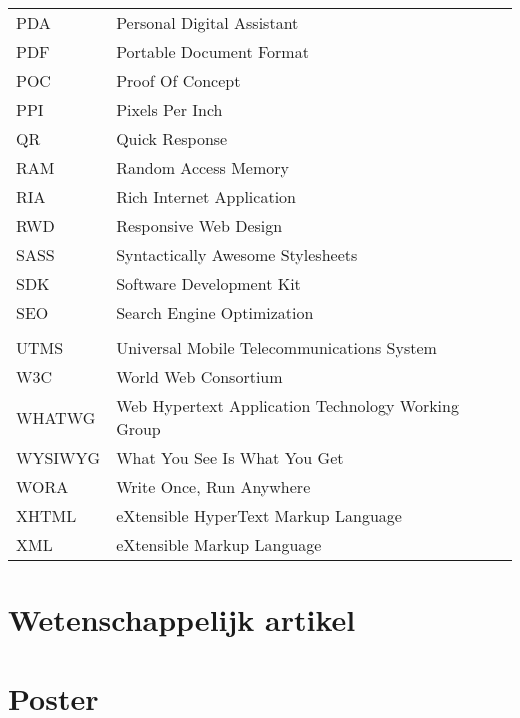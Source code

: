\documentclass[master=cws,dutch,masteroption={vs,gs},inputenc=utf8]{kulemt}
\begin{document}
\begin{flushleft}
\begin{longtable}{p{2cm} l}
     PDA & Personal Digital Assistant \\
     PDF & Portable Document Format \\
     POC & Proof Of Concept \\
     PPI & Pixels Per Inch \\
     QR & Quick Response \\
     RAM & Random Access Memory \\
     RIA & Rich Internet Application \\
     RWD & Responsive Web Design \\
     SASS & Syntactically Awesome Stylesheets \\
     SDK & Software Development Kit \\
     SEO & Search Engine Optimization \\
     \sta{} & \st{} \\
     UTMS & Universal Mobile Telecommunications System \\
     W3C & World Web Consortium \\
     WHATWG & Web Hypertext Application Technology Working Group \\
     WYSIWYG & What You See Is What You Get \\
     WORA & Write Once, Run Anywhere \\
     XHTML & eXtensible HyperText Markup Language \\ 
     XML & eXtensible Markup Language
  \end{longtable}
\end{flushleft}

\mainmatter














       
\appendix


\chapter{Wetenschappelijk artikel}

\chapter{Poster}


\backmatter


\end{document}
